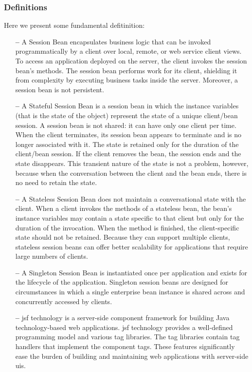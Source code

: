 \subsubsection{Definitions} \label{def}
Here we present some fundamental defitinition:
\begin{itemize}
\item[\textbf{--}] A \textsf{Session Bean} encapsulates business logic that can be invoked programmatically by a client over local, remote, or web service client views. To access an application deployed on the server, the client invokes the session bean's methods. The session bean performs work for its client, shielding it from complexity by executing business tasks inside the server. Moreover, a session bean is not persistent. 

\item[\textbf{--}] A \textsf{Stateful Session Bean} is a session bean in which the instance variables (that is the state of the object) represent the state of a unique client/bean session.
A session bean is not shared: it can have only one client per time. When the client terminates, its session bean appears to terminate and is no longer associated with it.
The state is retained only for the duration of the client/bean session. If the client removes the bean, the session ends and the state disappears. This transient nature of the state is not a problem, however, because when the conversation between the client and the bean ends, there is no need to retain the state.

\item[\textbf{--}] A \textsf{Stateless Session Bean} does not maintain a conversational state with the client. When a client invokes the methods of a stateless bean, the bean's instance variables may contain a state specific to that client but only for the duration of the invocation. When the method is finished, the client-specific state should not be retained. 
Because they can support multiple clients, stateless session beans can offer better scalability for applications that require large numbers of clients.

\item[\textbf{--}] A \textsf{Singleton Session Bean} is instantiated once per application and exists for the lifecycle of the application. Singleton session beans are designed for circumstances in which a single enterprise bean instance is shared across and concurrently accessed by clients.

\item[\textbf{--}] \textsf{\acl{jsf}} technology is a server-side component framework for building Java technology-based web applications.
\acs{jsf} technology provides a well-defined programming model and various tag libraries. The tag libraries contain tag handlers that implement the component tags. These features significantly ease the burden of building and maintaining web applications with server-side \acs{ui}s.

\end{itemize}


